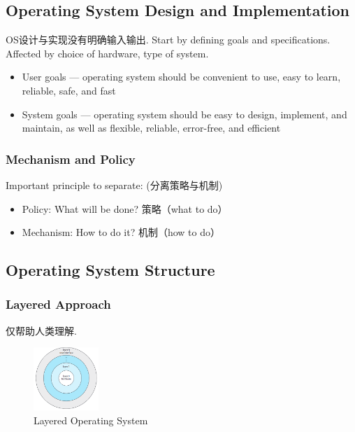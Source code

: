 \subsection{Operating System Design and Implementation}
OS设计与实现没有明确输入输出. Start by defining goals and specifications. Affected by choice of hardware, type of system. 

\begin{itemize}
    \item User goals --- operating system should be convenient to use, easy to learn, reliable, safe, and fast
    \item System goals --- operating system should be easy to design, implement, and maintain, as well as flexible, reliable, error-free, and efficient
\end{itemize}


\subsubsection{Mechanism and Policy}%
Important principle to separate: (分离策略与机制)
\begin{itemize}
    \item Policy: What will be done? 策略（what to do）
    \item Mechanism: How to do it? 机制（how to do）
\end{itemize}

\subsection{Operating System Structure}

\subsubsection{Layered Approach}
仅帮助人类理解. 
\begin{figure}[!htb]
    \centering
    \includegraphics[width=0.22\textwidth]{pic/OS2/Layered Operating System}
    \caption{Layered Operating System}
\end{figure}

